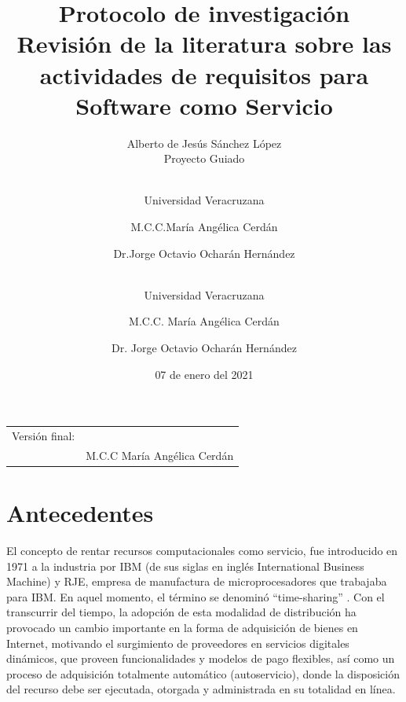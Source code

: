 \documentclass{article}
\begin{document}
  \title{%
  Protocolo de investigación\\

  \large Revisión de la literatura sobre las actividades de requisitos para Software como Servicio\\}
  \author{Alberto de Jesús Sánchez López \\ 
  \small Proyecto Guiado}
  \author{\\Universidad Veracruzana \and M.C.C.María Angélica Cerdán \and Dr.Jorge Octavio Ocharán Hernández}
  \author{\\Universidad Veracruzana\\ \and M.C.C. María Angélica Cerdán \and Dr. Jorge Octavio Ocharán Hernández}
  \date{07 de enero del 2021}
  \maketitle
  \hfill
  \begin{tabular}{@{}p{.5in}p{4in}@{}}
          Versión final: & \hrulefill \\
          & M.C.C María Angélica Cerdán \\
  \end{tabular}
  \thispagestyle{empty}
  \newpage

  \tableofcontents
  \thispagestyle{empty}
  \newpage

\setcounter{page}{1}
\section{Antecedentes}

El concepto de rentar recursos computacionales como servicio, fue introducido en 1971 a la industria por IBM (de sus siglas en inglés International Business Machine) y RJE, empresa de manufactura de microprocesadores que 
trabajaba para IBM. En aquel momento, el término se denominó “time-sharing” \cite{antecedentes6}. Con el transcurrir del tiempo, la adopción de esta modalidad de distribución ha provocado un cambio importante en la forma 
de adquisición de bienes en Internet, motivando el surgimiento de proveedores en servicios digitales dinámicos, que proveen funcionalidades y modelos de pago flexibles, así como un proceso de adquisición totalmente 
automático (autoservicio), donde la disposición del recurso debe ser ejecutada, otorgada y administrada en su totalidad en línea.
\end{document}

